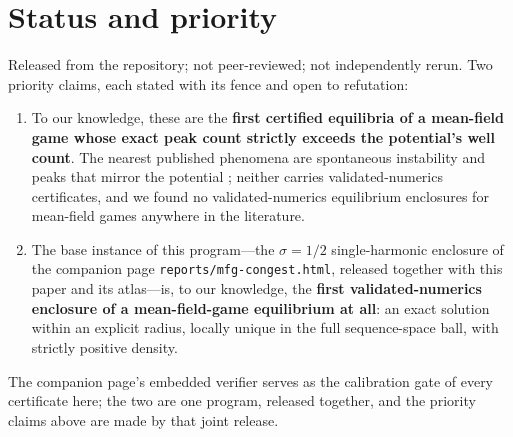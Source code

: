 \documentclass[11pt]{article}
\begin{document}
\section{Status and priority}\label{sec:status}

Released from the repository; not peer-reviewed; not independently rerun. Two
priority claims, each stated with its fence and open to refutation:
\begin{enumerate}
\item To our knowledge, these are the \textbf{first certified equilibria of a
mean-field game whose exact peak count strictly exceeds the potential's well
count}. The nearest published phenomena are spontaneous instability
\cite{Karuturi} and peaks that mirror the potential \cite{CesaroniCirant};
neither carries validated-numerics certificates, and we found no
validated-numerics equilibrium enclosures for mean-field games anywhere in the
literature.
\item The base instance of this program---the $\sigma=1/2$ single-harmonic
enclosure of the companion page \texttt{reports/mfg-congest.html}, released
together with this paper and its atlas---is, to our knowledge, the
\textbf{first validated-numerics enclosure of a mean-field-game equilibrium at
all}: an exact solution within an explicit radius, locally unique in the full
sequence-space ball, with strictly positive density.
\end{enumerate}
The companion page's embedded verifier serves as the calibration gate of every
certificate here; the two are one program, released together, and the
priority claims above are made by that joint release.
\end{document}
